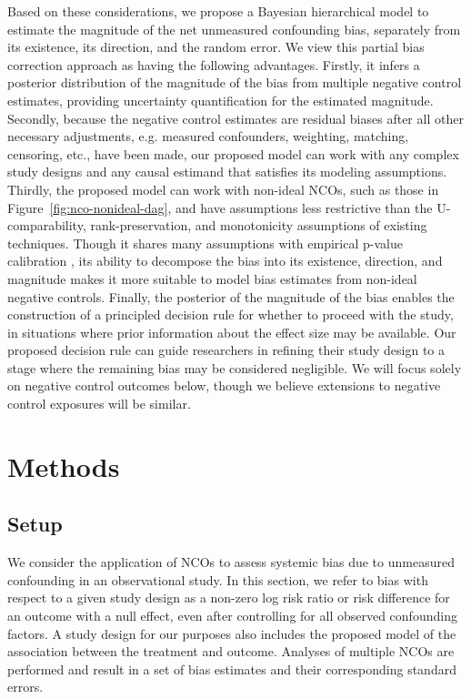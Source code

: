 Based on these considerations, we propose a Bayesian hierarchical model to estimate the magnitude of the net unmeasured confounding bias, separately from its existence, its direction, and the random error. We view this partial bias correction approach as having the following advantages. Firstly, it infers a posterior distribution of the magnitude of the bias from multiple negative control estimates, providing uncertainty quantification for the estimated magnitude. Secondly, because the negative control estimates are residual biases after all other necessary adjustments, e.g. measured confounders, weighting, matching, censoring, etc., have been made, our proposed model can work with any complex study designs and any causal estimand that satisfies its modeling assumptions.
Thirdly, the proposed model can work with non-ideal NCOs, such as those in Figure~\ref{fig:nco-nonideal-dag}, and have assumptions less restrictive than the U-comparability, rank-preservation, and monotonicity assumptions of existing techniques. Though it shares many assumptions with empirical p-value calibration \cite{schuemie2016robust}, its ability to decompose the bias into its existence, direction, and magnitude makes it more suitable to model bias estimates from non-ideal negative controls.
Finally, the posterior of the magnitude of the bias enables the construction of a principled decision rule for whether to proceed with the study, in situations where prior information about the effect size may be available. Our proposed decision rule can guide researchers in refining their study design to a stage where the remaining bias may be considered negligible. We will focus solely on negative control outcomes below, though we believe extensions to negative control exposures will be similar.

\section{Methods}
\label{sec:nco_method}

\subsection{Setup}

We consider the application of NCOs to assess systemic bias due to unmeasured confounding in an observational study. In this section, we refer to bias with respect to a given study design as a non-zero log risk ratio or risk difference for an outcome with a null effect, even after controlling for all observed confounding factors. A study design for our purposes also includes the proposed model of the association between the treatment and outcome. Analyses of multiple NCOs are performed and result in a set of bias estimates and their corresponding standard errors.

